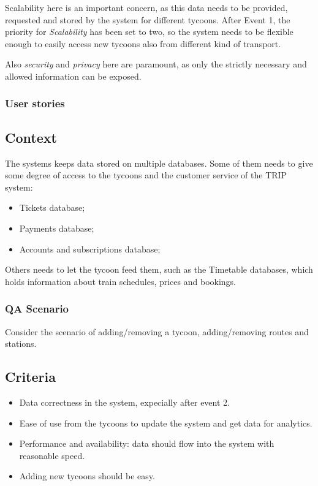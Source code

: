 Scalability here is an important concern, as this data needs to be provided, requested and stored by the system for different tycoons.
After Event 1, the priority for \textit{Scalability} has been set to two, so the system needs to be flexible enough to easily access new tycoons also from different kind of transport.

Also \textit{security} and \textit{privacy} here are paramount, as only the strictly necessary and allowed information can be exposed.

\subsubsection*{User stories}

\subsection*{Context}
The systems keeps data stored on multiple databases. 
Some of them needs to give some degree of access to the tycoons and the customer service of the TRIP system:
\begin{itemize}
    \item Tickets database;
    \item Payments database;
    \item Accounts and subscriptions database;
\end{itemize}

Others needs to let the tycoon feed them, such as the Timetable databases, which holds information about train schedules,
prices and bookings.

\subsubsection*{QA Scenario} %
Consider the scenario of adding/removing a tycoon, adding/removing routes and stations.
\subsection*{Criteria}
\begin{itemize}
    \item Data correctness in the system, expecially after event 2.
    \item Ease of use from the tycoons to update the system and get data for analytics.
    \item Performance and availability: data should flow into the system with reasonable speed.
    \item Adding new tycoons should be easy.
\end{itemize}

